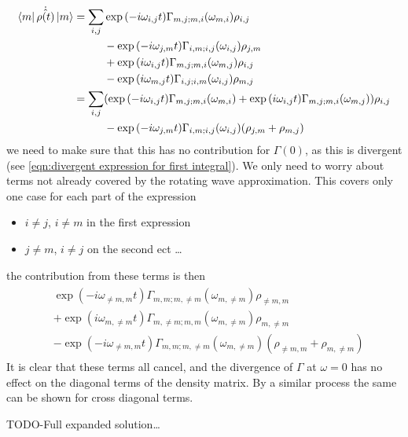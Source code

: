 \begin{align}
    \bra{m}\dot{\hat{\rho{}(t)}} \ket{m} & = \begin{aligned}[t]
        \sum_{i,j} &
        \exp{(-i\omega_{i,j} t)}
        \Gamma_{m,j;m, i}(\omega_{m,i})
        \rho_{i,j}   \\
                   &
        -\exp{(-i\omega_{j,m} t)}
        \Gamma_{i,m;i, j}(\omega_{i,j})
        \rho_{j, m}  \\
                   &
        +\exp{(i\omega_{i,j} t)}
        \Gamma_{m,j; m, i}(\omega_{m,j})
        \rho_{i, j}  \\
                   &
        -\exp{(i\omega_{m,j} t)}
        \Gamma_{i,j; i, m}(\omega_{i,j})
        \rho_{m, j}
    \end{aligned} \\
                                         & = \begin{aligned}[t]
        \sum_{i,j} &
        (\exp{(-i\omega_{i,j} t)}
        \Gamma_{m,j;m, i}(\omega_{m,i})
        +\exp{(i\omega_{i,j} t)}
        \Gamma_{m,j; m, i}(\omega_{m,j})
        )\rho_{i,j}                 \\
                   &
        -\exp{(-i\omega_{j,m} t)}
        \Gamma_{i,m;i, j}(\omega_{i,j})
        (\rho_{j, m} + \rho_{m, j}) \\
    \end{aligned}
\end{align}
we need to make sure that this
has no contribution for
\(\Gamma(0)\), as this is divergent
(see \cref{eqn:divergent expression for first integral}).
We only need
to worry about terms not already
covered by the rotating wave approximation.
This covers only one case for each part of
the expression
\begin{itemize}
    \item \(i \neq j\), \(i \neq m\) in the
          first expression
    \item \(j\neq m\), \(i \neq j\) on the
          second ect \ldots
\end{itemize}
the contribution from these
terms is then
\begin{align}
    \begin{aligned}
         & \exp{(-i\omega_{\neq m,m} t)}
        \Gamma_{m,m;m, \neq m}(\omega_{m,\neq m})
        \rho_{\neq m,m}                  \\
         &
        +\exp{(i\omega_{m,\neq m} t)}
        \Gamma_{m,\neq m; m, m}(\omega_{m,\neq m})
        \rho_{m,\neq m}                  \\
         &
        -\exp{(-i\omega_{\neq m,m} t)}
        \Gamma_{m,m;m, \neq m}(\omega_{m,\neq m})
        (\rho_{\neq m, m} + \rho_{m, \neq m})
    \end{aligned}
\end{align}
It is clear that these terms all cancel,
and the divergence of \(\Gamma \) at \(\omega = 0\)
has no effect on the diagonal terms of the
density matrix. By a similar process the same can
be shown for cross diagonal terms.

TODO-Full expanded solution\ldots